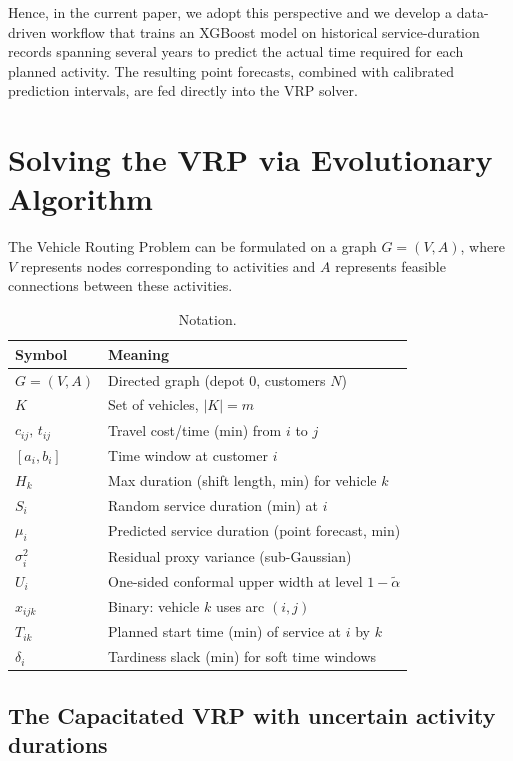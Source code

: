 \documentclass[preprint,12pt]{elsarticle}
\begin{document}
Hence, in the current paper, we adopt this perspective and we develop a data-driven workflow that trains an XGBoost model on historical service-duration records spanning several years to predict the actual time required for each planned activity. The resulting point forecasts, combined with calibrated prediction intervals, are fed directly into the VRP solver.





\section{Solving the VRP via Evolutionary Algorithm}
\label{sec:opt_methods}

The Vehicle Routing Problem can be formulated on a graph $G = (V, A)$, where $V$ represents nodes corresponding to activities and $A$ represents feasible connections between these activities.

\begin{table}[H]
\centering
\caption{Notation.}
\label{tab:notation}
\begin{tabular}{ll}
\toprule
Symbol & Meaning \\
\midrule
$G=(V,A)$ & Directed graph (depot $0$, customers $N$) \\
$K$ & Set of vehicles, $|K|=m$ \\
$c_{ij},\, t_{ij}$ & Travel cost/time (min) from $i$ to $j$ \\
$[a_i,b_i]$ & Time window at customer $i$ \\
$H_k$ & Max duration (shift length, min) for vehicle $k$ \\
$S_i$ & Random service duration (min) at $i$ \\
$\mu_i$ & Predicted service duration (point forecast, min) \\
$\sigma_i^2$ & Residual proxy variance (sub-Gaussian) \\
$U_i$ & One-sided conformal upper width at level $1-\tilde{\alpha}$ \\
$x_{ijk}$ & Binary: vehicle $k$ uses arc $(i,j)$ \\
$T_{ik}$ & Planned start time (min) of service at $i$ by $k$ \\
$\delta_i$ & Tardiness slack (min) for soft time windows \\
\bottomrule
\end{tabular}
\end{table}

  \subsection{The Capacitated VRP with uncertain activity durations}
  \label{cvprtw}
\end{document}
